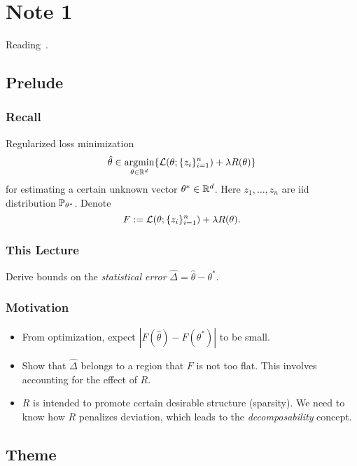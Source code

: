 \section{Note 1}
Reading~\cite{negahban2012}.
\subsection{Prelude}

\subsubsection{Recall}

Regularized loss minimization
\begin{equation}
\hat\theta \in \mathop{\mathrm{argmin}}_{\theta\in{\mathbb{R}}^d} \{\mathcal{L}(\theta;\{z_i\}_{i=1}^n) + \lambda R(\theta)\}
\end{equation}
for estimating a certain unknown vector $\theta^*\in{\mathbb{R}}^d$.
Here $z_1,\dots,z_n$ are iid \wrt distribution $\mathbb{P}_{\theta^*}$.
Denote
\begin{equation}
F := \mathcal{L}(\theta;\{z_i\}_{i=1}^n) + \lambda R(\theta).
\end{equation}

\subsubsection{This Lecture}

Derive bounds on the \emph{statistical error}
$\hat\Delta = \hat\theta - \theta^*$.

\subsubsection{Motivation}

\begin{itemize}
    \item From optimization, expect
        $|F(\hat\theta) - F(\theta^*)|$
        to be small.
    \item Show that $\hat\Delta$ belongs to a region
        that $F$ is not too flat.
        This involves accounting for the effect of $R$.
    \item $R$ is intended to promote certain desirable structure (\eg sparsity).
        We need to know how $R$ penalizes deviation,
        which leads to the \emph{decomposability} concept.
\end{itemize}

\subsection{Theme}

